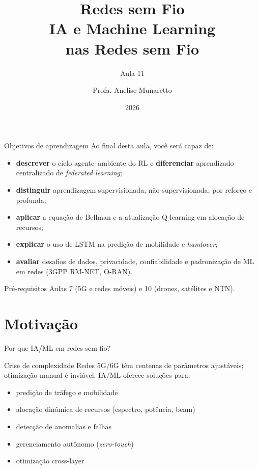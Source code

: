 \documentclass[aspectratio=169,11pt]{beamer}
\title[Redes sem Fio]{Redes sem Fio\\ IA e Machine Learning\\ nas Redes sem Fio}
\subtitle{Aula 11}
\author[Anelise Munaretto]{Profa. Anelise Munaretto}
\institute[Curso]{Redes sem Fio --- Ciência da Computação}
\date{2026}
\begin{document}
\begin{frame}[plain]
  \titlepage
\end{frame}

\begin{frame}{Objetivos de aprendizagem}
  Ao final desta aula, você será capaz de:
  \begin{itemize}
    \item \textbf{descrever} o ciclo agente--ambiente do RL e \textbf{diferenciar} aprendizado centralizado de \emph{federated learning};
    \item \textbf{distinguir} aprendizagem supervisionada, não-supervisionada, por reforço e profunda;
    \item \textbf{aplicar} a equação de Bellman e a atualização Q-learning em alocação de recursos;
    \item \textbf{explicar} o uso de LSTM na predição de mobilidade e \emph{handover};
    \item \textbf{avaliar} desafios de dados, privacidade, confiabilidade e padronização de ML em redes (3GPP RM-NET, O-RAN).
  \end{itemize}
  \begin{alertblock}{Pré-requisitos}
    Aulas 7 (5G e redes móveis) e 10 (drones, satélites e NTN).
  \end{alertblock}
\end{frame}

\section{Motivação}

\begin{frame}{Por que IA/ML em redes sem fio?}
  \begin{block}{Crise de complexidade}
    Redes 5G/6G têm centenas de parâmetros ajustáveis; otimização manual é inviável. IA/ML oferece soluções para:
  \end{block}
  \begin{itemize}
    \item predição de tráfego e mobilidade
    \item alocação dinâmica de recursos (espectro, potência, beam)
    \item detecção de anomalias e falhas
    \item gerenciamento autônomo (\emph{zero-touch})
    \item otimização cross-layer
  \end{itemize}
\end{frame}
\end{document}
